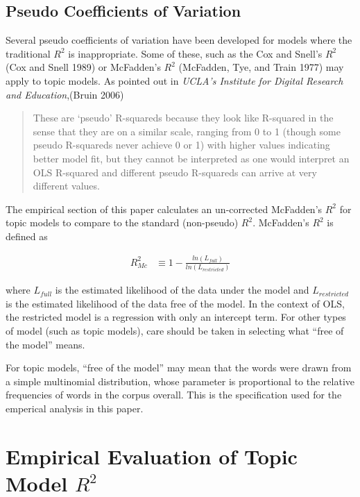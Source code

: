 \documentclass[conference,final,]{IEEEtran}
\begin{document}
\hypertarget{pseudo-coefficients-of-variation}{%
\subsection{Pseudo Coefficients of
Variation}\label{pseudo-coefficients-of-variation}}

Several pseudo coefficients of variation have been developed for models
where the traditional \(R^2\) is inappropriate. Some of these, such as
the Cox and Snell's \(R^2\) (Cox and Snell 1989) or McFadden's \(R^2\)
(McFadden, Tye, and Train 1977) may apply to topic models. As pointed
out in \emph{UCLA's Institute for Digital Research and Education},(Bruin
2006)

\begin{quote}
These are `pseudo' R-squareds because they look like R-squared in the sense that they are on a similar scale, ranging from 0 to 1 (though some pseudo R-squareds never achieve 0 or 1) with higher values indicating better model fit, but they cannot be interpreted as one would interpret an OLS R-squared and different pseudo R-squareds can arrive at very different values. 
\end{quote}

The empirical section of this paper calculates an un-corrected
McFadden's \(R^2\) for topic models to compare to the standard
(non-pseudo) \(R^2\). McFadden's \(R^2\) is defined as

\begin{align}
    R^2_{Mc} & \equiv 1 - \frac{ ln( L_{full} ) }{ ln( L_{restricted} ) }
\end{align}

where \(L_{full}\) is the estimated likelihood of the data under the
model and \(L_{restricted}\) is the estimated likelihood of the data
free of the model. In the context of OLS, the restricted model is a
regression with only an intercept term. For other types of model (such
as topic models), care should be taken in selecting what ``free of the
model'' means.

For topic models, ``free of the model'' may mean that the words were
drawn from a simple multinomial distribution, whose parameter is
proportional to the relative frequencies of words in the corpus overall.
This is the specification used for the emperical analysis in this paper.

\hypertarget{empirical-evaluation-of-topic-model-r2}{%
\section{\texorpdfstring{Empirical Evaluation of Topic Model
\(R^2\)}{Empirical Evaluation of Topic Model R\^{}2}}\label{empirical-evaluation-of-topic-model-r2}}
\end{document}
